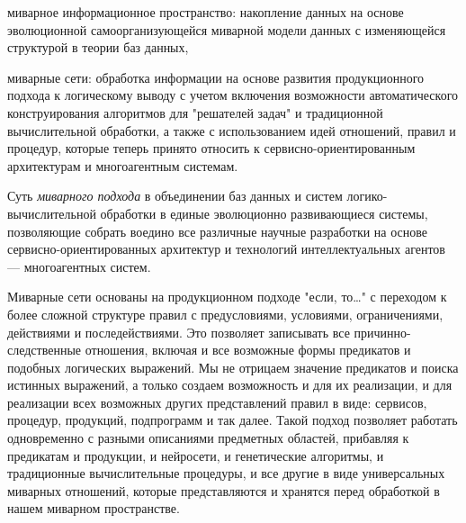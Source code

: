 \begin{textitemize}
	\item{миварное информационное пространство: накопление данных на основе эволюционной самоорганизующейся миварной модели данных с изменяющейся структурой в теории баз данных,}
	\item{миварные сети: обработка информации на основе развития продукционного подхода к логическому выводу с учетом включения возможности автоматического конструирования алгоритмов для "решателей задач"{} и традиционной вычислительной обработки, а также с использованием идей отношений, правил и процедур, которые теперь принято относить к сервисно-ориентированным архитектурам и многоагентным системам.}
\end{textitemize}


Суть \textit{миварного подхода} в объединении баз данных и систем логико-вычислительной обработки в единые эволюционно развивающиеся системы, позволяющие собрать воедино все различные научные разработки на основе сервисно-ориентированных архитектур и технологий интеллектуальных агентов --- многоагентных систем. 

Миварные сети основаны на продукционном подходе "если, то…"{} с переходом к более сложной структуре правил с предусловиями, условиями, ограничениями, действиями и последействиями. Это позволяет записывать все причинно-следственные отношения, включая и все возможные формы предикатов и подобных логических выражений. Мы не отрицаем значение предикатов и поиска истинных выражений, а только создаем возможность и для их реализации, и для реализации всех возможных других представлений правил в виде: сервисов, процедур, продукций, подпрограмм и так далее. Такой подход позволяет работать одновременно с разными описаниями предметных областей, прибавляя к предикатам и продукции, и нейросети, и генетические алгоритмы, и традиционные вычислительные процедуры, и все другие в виде универсальных миварных отношений, которые представляются и хранятся перед обработкой в нашем миварном пространстве. 

%